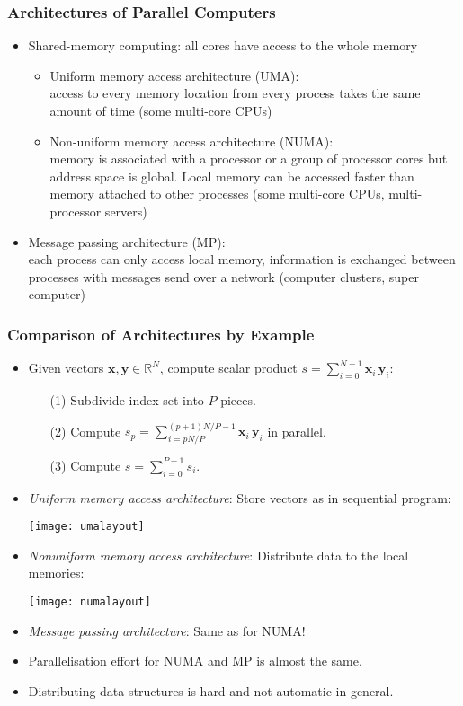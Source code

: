 \begin{frame}
\frametitle<presentation>{Architectures of Parallel Computers}
\begin{itemize}
\item Shared-memory computing: all cores have access to the whole memory
\begin{itemize}
\item Uniform memory access architecture (UMA): \\
 access to every memory location from every process takes the
same amount of time (some multi-core CPUs)
\item Non-uniform memory access architecture (NUMA): \\
memory is associated with a processor or a group of processor cores but address space is
global. Local memory can be accessed faster than memory attached
to other processes (some multi-core CPUs, multi-processor servers)
\end{itemize}
\item Message passing architecture (MP): \\
 each process can only access local memory, information is exchanged
between processes with messages send over a network (computer clusters, super computer)
\end{itemize}
\end{frame}


\begin{frame}
\frametitle{Comparison of Architectures by Example}
\begin{itemize}
\item Given vectors $\mathbf{x},\mathbf{y}\in\mathbb{R}^N$, compute scalar product $s =
  \sum_{i=0}^{N-1} \mathbf{x}_i \, \mathbf{y}_i$:
\begin{itemize}
\item[(1)] Subdivide index set into $P$ pieces.
\item[(2)] Compute $s_p=\sum_{i=pN/P}^{(p+1)N/P-1} \mathbf{x}_i \, \mathbf{y}_i$ in
  parallel.
\item[(3)] Compute $s = \sum_{i=0}^{P-1} s_i$.
\end{itemize}
\item \textit{Uniform memory access architecture}: Store vectors as in
  sequential program:
\begin{center}
  \texttt{[image: umalayout]}
\end{center}
\item \textit{Nonuniform memory access architecture}: Distribute
  data to the local memories:
\begin{center}
  \texttt{[image: numalayout]}
\end{center}
\item \textit{Message passing architecture}: Same as for NUMA!
\item Parallelisation effort for NUMA and MP is almost the same.
\item Distributing data structures is hard and not automatic in
  general.
\end{itemize}
\end{frame}



